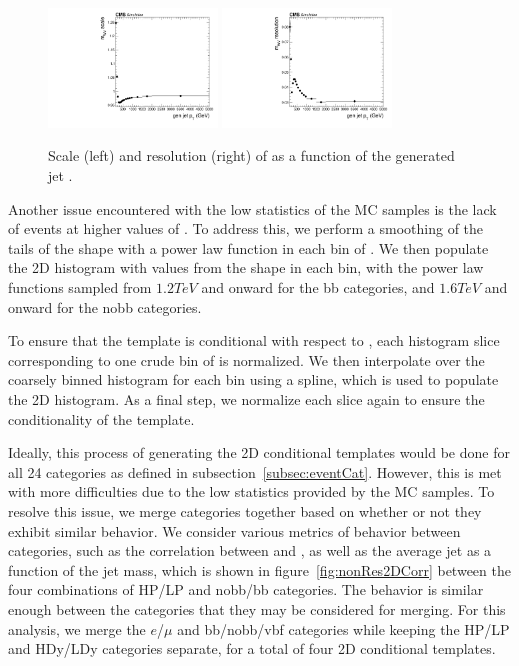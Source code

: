 \begin{figure}[htbp]
  \centering
  \includegraphics[width=0.4\textwidth]{fig/2Dfit/detectorParam_nonRes_scale_MVV.pdf}
  \includegraphics[width=0.4\textwidth]{fig/2Dfit/detectorParam_nonRes_resolution_MVV.pdf}
  \caption{
    Scale (left) and resolution (right) of \MVV as a function of the generated jet \pt.
  }
  \label{fig:nonResScaleResMVV}
\end{figure}

Another issue encountered with the low statistics of the MC samples is the lack of events at higher values of \MVV.
To address this, we perform a smoothing of the tails of the \MVV shape with a power law function in each bin of \MJ.
We then populate the 2D histogram with values from the \MVV shape in each \MJ bin, with the power law functions sampled from $1.2\unit{TeV}$ and onward for the bb categories, and $1.6\unit{TeV}$ and onward for the nobb categories.

To ensure that the template is conditional with respect to \MJ, each histogram slice corresponding to one crude bin of \MJ is normalized.
We then interpolate over the coarsely binned \MJ histogram for each \MVV bin using a spline, which is used to populate the 2D histogram.
As a final step, we normalize each \MJ slice again to ensure the conditionality of the template.

Ideally, this process of generating the 2D conditional templates would be done for all 24 categories as defined in subsection~\ref{subsec:eventCat}.
However, this is met with more difficulties due to the low statistics provided by the MC samples.
To resolve this issue, we merge categories together based on whether or not they exhibit similar behavior.
We consider various metrics of behavior between categories, such as the correlation between \MJ and \MVV, as well as the average jet \pt as a function of the jet mass, which is shown in figure~\ref{fig:nonRes2DCorr} between the four combinations of HP/LP and nobb/bb categories.
The behavior is similar enough between the categories that they may be considered for merging.
For this analysis, we merge the $e$/$\mu$ and bb/nobb/vbf categories while keeping the HP/LP and HDy/LDy categories separate, for a total of four 2D conditional templates.


